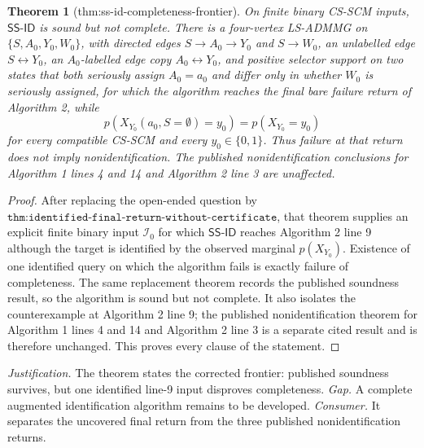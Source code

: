 \documentclass{article}
\newtheorem{theorem}{Theorem}
\begin{document}
\begin{theorem}[thm:ss-id-completeness-frontier]\label{thm:ss-id-completeness-frontier}
On finite binary CS-SCM inputs, \(\mathsf{SS\text{-}ID}\) is sound but not complete. There is a four-vertex LS-ADMMG on \(\{S,A_0,Y_0,W_0\}\), with directed edges \(S\to A_0\to Y_0\) and \(S\to W_0\), an unlabelled edge \(S\leftrightarrow Y_0\), an \(A_0\)-labelled edge copy \(A_0\leftrightarrow Y_0\), and positive selector support on two states that both seriously assign \(A_0=a_0\) and differ only in whether \(W_0\) is seriously assigned, for which the algorithm reaches the final bare failure return of Algorithm 2, while
\[p(X_{Y_0}(a_0,S=\emptyset)=y_0)=p(X_{Y_0}=y_0)\]
for every compatible CS-SCM and every \(y_0\in\{0,1\}\). Thus failure at that return does not imply nonidentification. The published nonidentification conclusions for Algorithm 1 lines 4 and 14 and Algorithm 2 line 3 are unaffected.
\end{theorem}
\begin{proof}
After replacing the open-ended question by \(\texttt{thm:identified-final-return-without-certificate}\), that theorem supplies an explicit finite binary input \(\mathcal I_0\) for which \(\mathsf{SS\text{-}ID}\) reaches Algorithm 2 line 9 although the target is identified by the observed marginal \(p(X_{Y_0})\). Existence of one identified query on which the algorithm fails is exactly failure of completeness. The same replacement theorem records the published soundness result, so the algorithm is sound but not complete. It also isolates the counterexample at Algorithm 2 line 9; the published nonidentification theorem for Algorithm 1 lines 4 and 14 and Algorithm 2 line 3 is a separate cited result and is therefore unchanged. This proves every clause of the statement.
\end{proof}
\par\smallskip\noindent \textit{Justification.} The theorem states the corrected frontier: published soundness survives, but one identified line-9 input disproves completeness. \textit{Gap.} A complete augmented identification algorithm remains to be developed. \textit{Consumer.} It separates the uncovered final return from the three published nonidentification returns.
\end{document}
